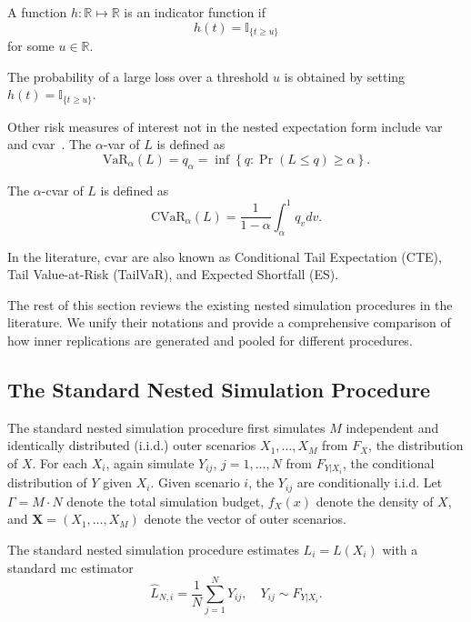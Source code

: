 \begin{definition}\label{def1:indicator}
    A function $h: \mathbb{R} \mapsto \mathbb{R}$ is an indicator function if 
    $$h(t) = \mathbb{I}_{\{t \geq u\}}$$
    for some $u \in \mathbb{R}$.
\end{definition}

The probability of a large loss over a threshold $u$ is obtained by setting $h(t) = \mathbb{I}_{\{t \geq u\}}$.

Other risk measures of interest not in the nested expectation form include \gls{var} and \gls{cvar}~\citep{hardy2022quantitative}. 
The $\alpha$-\gls{var} of $L$ is defined as
\begin{equation}\label{eq1:var}
    \mbox{VaR}_\alpha(L) = q_\alpha = \inf \left\{ q: \Pr(L\leq q) \geq \alpha \right\}.
\end{equation}
    
The $\alpha$-\gls{cvar} of $L$ is defined as
\begin{equation}\label{eq1:cvar}
    \mbox{CVaR}_\alpha(L) =\frac{1}{1-\alpha} \int_{\alpha}^{1} q_v dv. 
\end{equation}

In the literature, \gls{cvar} are also known as Conditional Tail Expectation (CTE), Tail Value-at-Risk (TailVaR), and Expected Shortfall (ES).

The rest of this section reviews the existing nested simulation procedures in the literature.
We unify their notations and provide a comprehensive comparison of how inner replications are generated and pooled for different procedures.

\subsection{The Standard Nested Simulation Procedure}

The standard nested simulation procedure first simulates $M$ independent and identically distributed (i.i.d.) outer scenarios $X_1, \dots, X_M$ from $F_X$, the distribution of $X$.
For each $X_i$, again simulate $Y_{ij}$, $j = 1, \dots, N$ from $F_{Y|X_i}$, the conditional distribution of $Y$ given $X_i$.
Given scenario $i$, the $Y_{ij}$ are conditionally i.i.d.
Let $\Gamma = M \cdot N$ denote the total simulation budget, $f_X(x)$ denote the density of $X$, and $\mathbf{X} = (X_1, \dots, X_M)$ denote the vector of outer scenarios.

The standard nested simulation procedure estimates $L_i = L(X_i)$ with a standard \gls{mc} estimator 
\begin{equation*}
  \hat{L}_{N, i} = \frac{1}{N} \sum_{j=1}^N Y_{ij}, \quad Y_{ij} \sim F_{Y|X_i}.  
\end{equation*}


